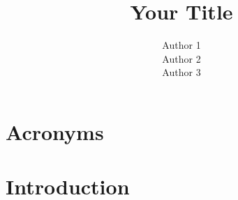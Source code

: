 

\title{Your Title}
\author{Author 1\\
Author 2\\
Author 3}



%

\chapter*{Acronyms}


\tableofcontents



\clearpage
{}
\pagestyle{fancy}

\chapter{Introduction}\label{chap:intro}






